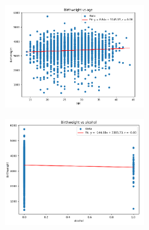 \documentclass{uofa-eng-assignment}
\begin{document}
\begin{enumerate}
        \begin{figure}[H]
            \centering
            \includegraphics[width=0.55\textwidth]{bw-age.png}
        \end{figure}
        \begin{figure}[H]
            \centering
            \includegraphics[width=0.55\textwidth]{bw-alco.png}
        \end{figure}
\end{enumerate}
\end{document}
